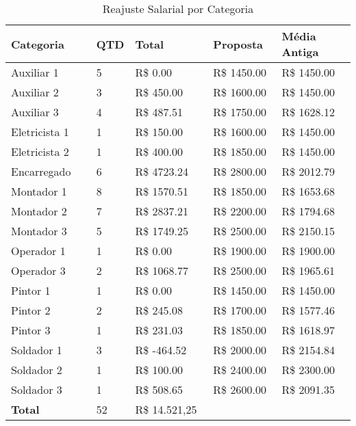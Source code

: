 \documentclass[a4paper, 12pt]{CSSullivanBusinessReport}
\begin{document}
\begin{fullwidth}
\begin{table}[H] 
	\caption{Reajuste Salarial por Categoria}
	\begin{tabular}{L{0.25\linewidth} R{0.1\linewidth} R{0.23\linewidth} R{0.2\linewidth} R{0.3\linewidth}} 
		\toprule
		\textbf{Categoria} & \textbf{QTD} & \textbf{Total} & \textbf{Proposta} & \textbf{Média Antiga}\\
		\midrule
  Auxiliar 1 &   5 & R\$ 0.00 & R\$ 1450.00 & R\$ 1450.00 \\ 
  Auxiliar 2 &   3 & R\$ 450.00 & R\$ 1600.00 & R\$ 1450.00 \\ 
  Auxiliar 3 &   4 & R\$ 487.51 & R\$ 1750.00 & R\$ 1628.12 \\ 
  Eletricista 1 &   1 & R\$ 150.00 & R\$ 1600.00 & R\$ 1450.00 \\ 
  Eletricista 2 &   1 & R\$ 400.00 & R\$ 1850.00 & R\$ 1450.00 \\ 
  Encarregado &   6 & R\$ 4723.24 & R\$ 2800.00 & R\$ 2012.79 \\ 
  Montador 1 &   8 & R\$ 1570.51 & R\$ 1850.00 & R\$ 1653.68 \\ 
  Montador 2 &   7 & R\$ 2837.21 & R\$ 2200.00 & R\$ 1794.68 \\ 
  Montador 3 &   5 & R\$ 1749.25 & R\$ 2500.00 & R\$ 2150.15 \\ 
  Operador 1 &   1 & R\$ 0.00 & R\$ 1900.00 & R\$ 1900.00 \\ 
  Operador 3 &   2 & R\$ 1068.77 & R\$ 2500.00 & R\$ 1965.61 \\ 
  Pintor 1 &   1 & R\$ 0.00 & R\$ 1450.00 & R\$ 1450.00 \\ 
  Pintor 2 &   2 & R\$ 245.08 & R\$ 1700.00 & R\$ 1577.46 \\ 
  Pintor 3 &   1 & R\$ 231.03 & R\$ 1850.00 & R\$ 1618.97 \\ 
  Soldador 1 &   3 & \textcolor{slightlyred}{R\$ -464.52} & R\$ 2000.00 & R\$ 2154.84 \\ 
  Soldador 2 &   1 & R\$ 100.00 & R\$ 2400.00 & R\$ 2300.00 \\ 
  Soldador 3 &   1 & R\$ 508.65 & R\$ 2600.00 & R\$ 2091.35 \\ 
  \midrule
 \textbf{Total} & 52 & R\$ 14.521,25 & & \\
		\bottomrule
	\end{tabular}
	\label{tab:categorias}
\end{table}
\end{fullwidth}
\end{document}

